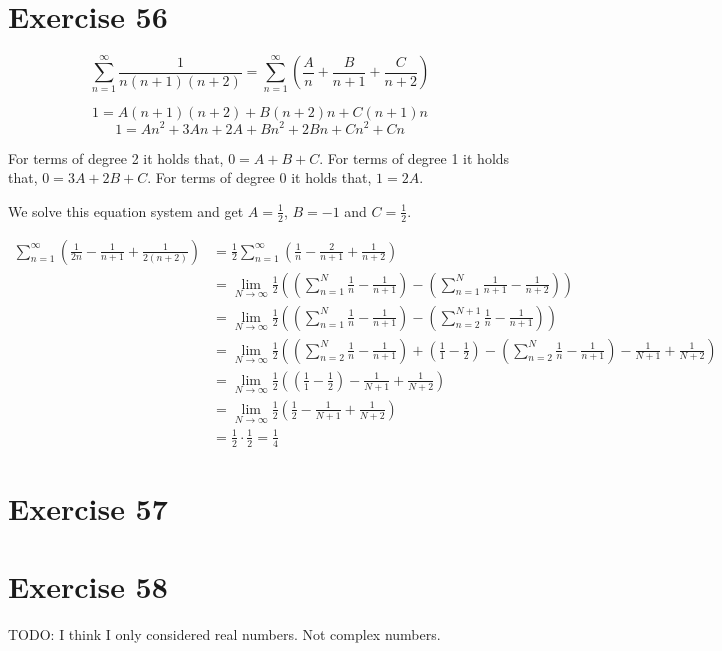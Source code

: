 \documentclass[a4paper]{article}
\theoremstyle{definition}
\begin{document}
\section{Exercise 56}
\[
  \sum_{n=1}^\infty \frac{1}{n (n+1) (n+2)}
  = \sum_{n=1}^\infty \left(\frac{A}{n} + \frac{B}{n+1} + \frac{C}{n+2}\right)
\]

\[ 1 = A (n+1) (n+2) + B (n+2) n + C (n+1) n \]
\[ 1 = A n^2 + 3 An + 2A + Bn^2 + 2 Bn + Cn^2 + Cn \]

For terms of degree 2 it holds that, $0 = A + B + C$.
For terms of degree 1 it holds that, $0 = 3A + 2B + C$.
For terms of degree 0 it holds that, $1 = 2A$.

We solve this equation system and get $A = \frac12$, $B = -1$ and $C = \frac12$.

\begin{align*}
  \sum_{n=1}^\infty \left(\frac1{2n} - \frac{1}{n+1} + \frac1{2(n+2)}\right)
    &= \frac12 \sum_{n=1}^\infty \left(\frac1n - \frac2{n+1} + \frac1{n+2}\right) \\
    &= \lim_{N\to\infty} \frac12 \left(\left(\sum_{n=1}^N \frac1n - \frac1{n+1}\right) - \left(\sum_{n=1}^N \frac1{n+1} - \frac1{n+2}\right)\right) \\
    &= \lim_{N\to\infty} \frac12 \left(\left(\sum_{n=1}^N \frac1n - \frac1{n+1}\right) - \left(\sum_{n=2}^{N+1} \frac1{n} - \frac1{n+1}\right)\right) \\
    &= \lim_{N\to\infty} \frac12 \left(\left(\sum_{n=2}^N \frac1n - \frac1{n+1}\right) + \left(\frac11 - \frac12\right) - \left(\sum_{n=2}^{N} \frac1{n} - \frac1{n+1}\right) - \frac1{N+1} + \frac1{N+2}\right) \\
    &= \lim_{N\to\infty} \frac12 \left(\left(\frac11 - \frac12\right) - \frac1{N+1} + \frac1{N+2}\right) \\
    &= \lim_{N\to\infty} \frac12 \left(\frac12 - \frac1{N+1} + \frac1{N+2}\right) \\
    &= \frac12 \cdot \frac12 = \frac14
\end{align*}

\section{Exercise 57}
\section{Exercise 58}

TODO: I think I only considered real numbers. Not complex numbers.
\end{document}
